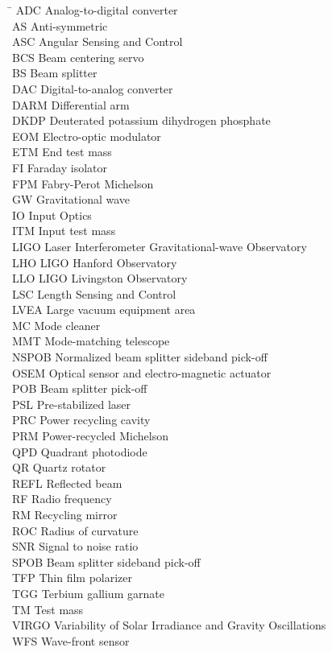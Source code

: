 \begin{tabbing}
\hspace{1in} \= \kill
ADC \> Analog-to-digital converter \\
AS \> Anti-symmetric \\
ASC \> Angular Sensing and Control \\
BCS \> Beam centering servo \\
BS \> Beam splitter \\
DAC \> Digital-to-analog converter\\
DARM \> Differential arm \\
DKDP \> Deuterated potassium dihydrogen phosphate \\
EOM \> Electro-optic modulator \\
ETM \> End test mass \\
FI \> Faraday isolator \\
FPM \> Fabry-Perot Michelson \\
GW \> Gravitational wave \\
IO \> Input Optics \\
ITM \> Input test mass \\
LIGO \> Laser Interferometer Gravitational-wave Observatory \\
LHO \> LIGO Hanford Observatory \\
LLO \> LIGO Livingston Observatory \\
LSC \> Length Sensing and Control \\
LVEA \> Large vacuum equipment area \\
MC \> Mode cleaner \\
MMT \> Mode-matching telescope \\
NSPOB \> Normalized beam splitter sideband pick-off \\
OSEM \> Optical sensor and electro-magnetic actuator \\
POB \> Beam splitter pick-off \\
PSL \> Pre-stabilized laser \\
PRC \> Power recycling cavity \\
PRM \> Power-recycled Michelson \\
QPD \> Quadrant photodiode \\
QR \> Quartz rotator \\
REFL \> Reflected beam \\
RF \> Radio frequency \\
RM \> Recycling mirror \\
ROC \> Radius of curvature \\
SNR \> Signal to noise ratio \\
SPOB \> Beam splitter sideband pick-off \\
TFP \> Thin film polarizer \\
TGG \> Terbium gallium garnate \\
TM \> Test mass \\
VIRGO \> Variability of Solar Irradiance and Gravity Oscillations \\
WFS \> Wave-front sensor 
\end{tabbing}
